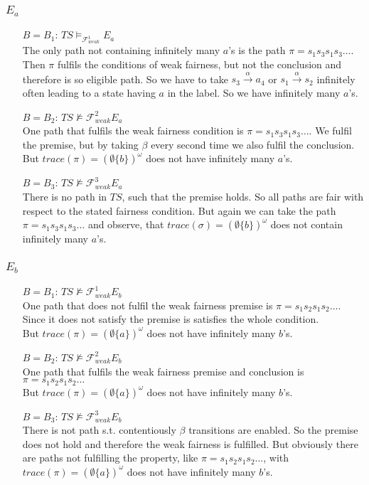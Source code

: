 \documentclass[11pt]{article}
\begin{document}
\subsubsection{$E_a$}
\begin{itemize}
	\item[$B=B_1$:] $TS \models_{\mathcal{F}_{weak}^1} E_a$\\
		The only path not containing infinitely many $a$'s is the path $\pi= s_1s_3s_1s_3\dots$. Then $\pi$ fulfils the conditions of weak fairness, but not the conclusion and therefore is so eligible path. So we have to take $s_3 \xrightarrow{\alpha}a_4$ or $s_1 \xrightarrow{\alpha} s_2$ infinitely often leading to a state having $a$ in the label. So we have infinitely many $a$'s.
	\item[$B=B_2$:] $TS \not\models{\mathcal{F}_{weak}^2} E_a$\\
		One path that fulfils the weak fairness condition is $\pi = s_1 s_3 s_1 s_3\dots$. We fulfil the premise, but by taking $\beta$ every second time we also fulfil the conclusion.\\
		But $trace(\pi) = (\emptyset\{b\})^\omega$ does not have infinitely many $a$'s.
	\item[$B=B_3$:] $TS \not\models{\mathcal{F}_{weak}^3} E_a$\\
		There is no path in $TS$, such that the premise holds. So all paths are fair with respect to the stated fairness condition. But again we can take the path $\pi = s_1 s_3 s_1 s_3\dots$ and observe, that $trace(\sigma) =(\emptyset\{b\})^\omega$ does not contain infinitely many $a$'s.
\end{itemize}

\subsubsection{$E_b$}
\begin{itemize}
	\item[$B=B_1$:] $TS \not\models{\mathcal{F}_{weak}^1} E_b$\\
		One path that does not fulfil the weak fairness premise is $\pi = s_1s_2s_1s_2\dots$. Since it does not satisfy the premise is satisfies the whole condition.\\
		But $trace(\pi) = (\emptyset\{a\})^\omega$ does not have infinitely many $b$'s.
	\item[$B=B_2$:] $TS \not\models{\mathcal{F}_{weak}^2} E_b$\\
		One path that fulfils the weak fairness premise and conclusion is $\pi = s_1s_2s_1s_2\dots$\\
		But $trace(\pi) = (\emptyset\{a\})^\omega$ does not have infinitely many $b$'s.
	\item[$B=B_3$:] $TS \not\models{\mathcal{F}_{weak}^3} E_b$\\
		There is not path s.t. contentiously $\beta$ transitions are enabled. So the premise does not hold and therefore the weak fairness is fulfilled. 
		But obviously there are paths not fulfilling the property, like $\pi = s_1s_2s_1s_2\dots$, with $trace(\pi) = (\emptyset\{a\})^\omega$ does not have infinitely many $b$'s.
\end{itemize}
\end{document}
